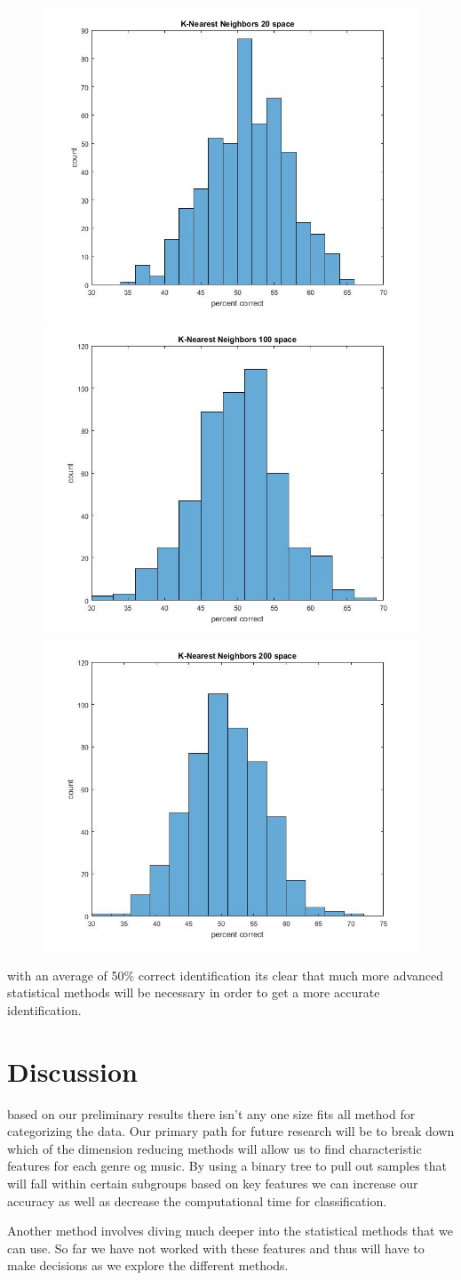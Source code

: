 \documentclass[10pt,a4paper]{article}
\begin{document}
	\begin{figure}[htp]
		\centering		
		\includegraphics[width = .45\textwidth]{K-Nearest_Neighbor_20.jpg}\quad	
		\includegraphics[width = .45\textwidth]{K-Nearest_Neighbor_100.jpg}\quad
		\medskip
		\includegraphics[width = .45\textwidth]{K-Nearest_Neighbor_200.jpg}
	\end{figure}
	with an average of 50$\% $ correct identification its clear that much more advanced statistical methods will be necessary in order to get a more accurate identification.
	
	

	\section{Discussion}
	based on our preliminary results there isn't any one size fits all method for categorizing the data. Our primary path for future research will be to break down which of the dimension reducing methods will allow us to find characteristic features for each genre og music. By using a binary tree to pull out samples that will fall within certain subgroups based on key features we can increase our accuracy as well as decrease the computational time for classification.
	
	Another method involves diving much deeper into the statistical methods that we can use. So far we have not worked with these features and thus will have to make decisions as we explore the different methods.
\end{document}
